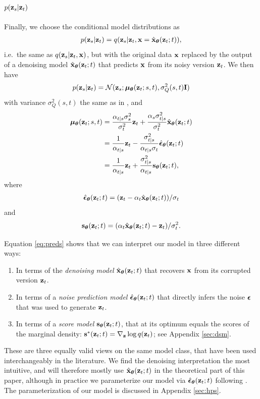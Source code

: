 \documentclass{article}
\begin{document}
\subsection{$p({\mathbf{z}}_s|{\mathbf{z}}_t)$}
Finally, we choose the conditional model distributions as
\begin{align}
p({\mathbf{z}}_s|{\mathbf{z}}_t) = q({\mathbf{z}}_s|{\mathbf{z}}_t, {\mathbf{x}}=\hat{{\mathbf{x}}}_{{\boldsymbol{\theta}}}({\mathbf{z}}_t; t)),
\label{eq:zs_given_zt_model}
\end{align}
i.e.\ the same as $q({\mathbf{z}}_s|{\mathbf{z}}_t,\mathbf{x})$, but with the original data ${\mathbf{x}}$ replaced by the output of a denoising model $\hat{{\mathbf{x}}}_{{\boldsymbol{\theta}}}({\mathbf{z}}_t; t)$ that predicts ${\mathbf{x}}$ from its noisy version ${\mathbf{z}}_t$. We then have
\begin{align}
p({\mathbf{z}}_s|{\mathbf{z}}_t) = \mathcal{N}({\mathbf{z}}_s; {\boldsymbol{\mu}}_{{\boldsymbol{\theta}}}({\mathbf{z}}_{t}; s, t), \sigma^2_Q(s,t) \mathbf{I})
\end{align}
with variance $\sigma^2_Q(s,t)$ the same as in , and 
\begin{align}
{\boldsymbol{\mu}}_{{\boldsymbol{\theta}}}({\mathbf{z}}_t; s, t) 
&= \frac{\alpha_{t|s}\sigma^{2}_s}{\sigma^{2}_t}{\mathbf{z}}_{t} + \frac{\alpha_s \sigma^{2}_{t|s}}{\sigma^{2}_{t}}\hat{{\mathbf{x}}}_{{\boldsymbol{\theta}}}({\mathbf{z}}_t; t) \nonumber\\
&= \frac{1}{\alpha_{t|s}}{\mathbf{z}}_{t} - \frac{\sigma^{2}_{t|s}}{\alpha_{t|s}\sigma_{t}}\hat{{\boldsymbol{\epsilon}}}_{{\boldsymbol{\theta}}}({\mathbf{z}}_t; t) \nonumber\\
&= \frac{1}{\alpha_{t|s}}{\mathbf{z}}_t + \frac{\sigma^2_{t|s}}{\alpha_{t|s}} \mathbf{s}_{{\boldsymbol{\theta}}}({\mathbf{z}}_t;t), \label{eq:preds}
\end{align}
where
\begin{align}
\hat{{\boldsymbol{\epsilon}}}_{{\boldsymbol{\theta}}}({\mathbf{z}}_t; t) = ({\mathbf{z}}_t - \alpha_t\hat{{\mathbf{x}}}_{{\boldsymbol{\theta}}}({\mathbf{z}}_t; t))/\sigma_t
\end{align}
and
\begin{align}
\mathbf{s}_{{\boldsymbol{\theta}}}({\mathbf{z}}_t;t) = (\alpha_t\hat{{\mathbf{x}}}_{{\boldsymbol{\theta}}}({\mathbf{z}}_t; t) - {\mathbf{z}}_t)/\sigma^{2}_t.
\end{align}

%
%
%
%
%
%
%
%
%
%
%
%

Equation \ref{eq:preds} shows that we can interpret our model in three different ways: 
\begin{enumerate}
\item In terms of the \emph{denoising model} $\hat{{\mathbf{x}}}_{{\boldsymbol{\theta}}}({\mathbf{z}}_t; t)$ that recovers ${\mathbf{x}}$ from its corrupted version ${\mathbf{z}}_t$.
\item In terms of a \emph{noise prediction model} $\hat{{\boldsymbol{\epsilon}}}_{{\boldsymbol{\theta}}}({\mathbf{z}}_t; t)$ that directly infers the noise ${\boldsymbol{\epsilon}}$ that was used to generate ${\mathbf{z}}_t$.
\item In terms of a \emph{score model} $\mathbf{s}_{{\boldsymbol{\theta}}}({\mathbf{z}}_t;t)$, that at its optimum equals the scores of the marginal density: $\mathbf{s}^*({\mathbf{z}}_t;t) = \nabla_{{\mathbf{z}}} \log q({\mathbf{z}}_t)$; see Appendix \ref{sec:dsm}.
\end{enumerate}
These are three equally valid views on the same model class, that have been used interchangeably in the literature. We find the denoising interpretation the most intuitive, and will therefore mostly use $\hat{{\mathbf{x}}}_{{\boldsymbol{\theta}}}({\mathbf{z}}_t; t)$ in the theoretical part of this paper, although in practice we parameterize our model via $\hat{{\boldsymbol{\epsilon}}}_{{\boldsymbol{\theta}}}({\mathbf{z}}_t; t)$ following \cite{ho2020denoising}. The parameterization of our model is discussed in Appendix \ref{sec:hps}.
\end{document}
